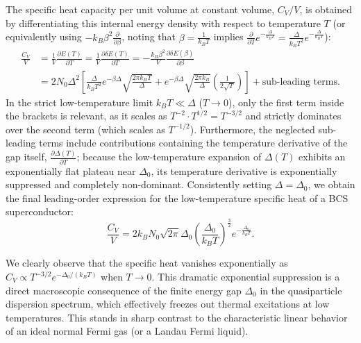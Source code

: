 The specific heat capacity per unit volume at constant volume, \( C_V / V \), is obtained by differentiating this internal energy density with respect to temperature \( T \) (or equivalently using \( -k_B \beta^2 \frac{\partial}{\partial \beta} \), noting that \( \beta = \frac{1}{k_B T} \) implies \( \frac{\partial}{\partial T} e^{-\frac{\Delta}{k_B T}} = \frac{\Delta}{k_B T^2} e^{-\frac{\Delta}{k_B T}} \)):
\[
    \begin{aligned}
        \frac{C_V}{V} & = \frac{1}{V} \frac{\partial E(T)}{\partial T} = \frac{1}{V} \frac{\partial \delta E(T)}{\partial T} = -\frac{k_B \beta^2}{V} \frac{\partial \delta E(\beta)}{\partial \beta}                                            \\
                      & = 2N_0 \Delta^2 \left[ \frac{\Delta}{k_B T^2} e^{-\beta\Delta} \sqrt{\frac{2\pi k_B T}{\Delta}} + e^{-\beta\Delta} \sqrt{\frac{2\pi k_B}{\Delta}} \left( \frac{1}{2\sqrt{T}} \right) \right] + \text{sub-leading terms}.
    \end{aligned}
\]
In the strict low-temperature limit \( k_B T \ll \Delta \) (\( T \to 0 \)), only the first term inside the brackets is relevant, as it scales as \( T^{-2} \cdot T^{1/2} = T^{-3/2} \) and strictly dominates over the second term (which scales as \( T^{-1/2} \)). Furthermore, the neglected sub-leading terms include contributions containing the temperature derivative of the gap itself, \( \frac{\partial \Delta(T)}{\partial T} \); because the low-temperature expansion of \( \Delta(T) \) exhibits an exponentially flat plateau near \( \Delta_0 \), its temperature derivative is exponentially suppressed and completely non-dominant. Consistently setting \( \Delta = \Delta_0 \), we obtain the final leading-order expression for the low-temperature specific heat of a BCS superconductor:
\begin{equation} \label{eq:bcs_specific_heat}
    \frac{C_V}{V} = 2k_B N_0 \sqrt{2\pi} \Delta_0 \left( \frac{\Delta_0}{k_B T} \right)^{\frac{3}{2}} e^{-\frac{\Delta_0}{k_B T}}.
\end{equation}


We clearly observe that the specific heat vanishes exponentially as \( C_V \propto T^{-3/2} e^{-\Delta_0 / (k_B T)} \) when \( T \to 0 \). This dramatic exponential suppression is a direct macroscopic consequence of the finite energy gap \( \Delta_0 \) in the quasiparticle dispersion spectrum, which effectively freezes out thermal excitations at low temperatures. This stands in sharp contrast to the characteristic linear behavior of an ideal normal Fermi gas (or a Landau Fermi liquid).


